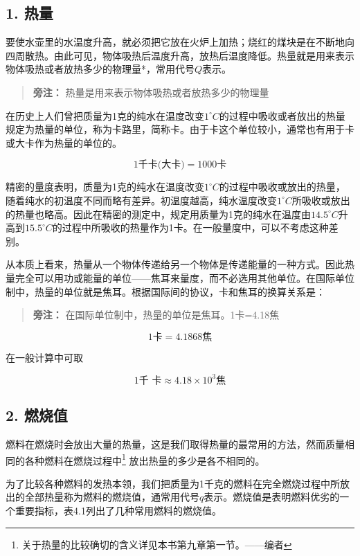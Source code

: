 \subsection{1. 热量}\label{ux70edux91cf}

要使水壶里的水温度升高，就必须把它放在火炉上加热；烧红的煤块是在不断地向四周散热。由此可见，物体吸热后温度升高，放热后温度降低。热量就是用来表示物体吸热或者放热多少的物理量*，常用代号\(Q\)表示。

\begin{quote}
\textbf{旁注：} 热量是用来表示物体吸热或者放热多少的物理量
\end{quote}

在历史上人们曾把质量为1克的纯水在温度改变\(1^{\circ}C\)的过程中吸收或者放出的热量规定为热量的单位，称为卡路里，简称卡。由于卡这个单位较小，通常也有用于卡或大卡作为热量的单位的。

\[
1 \text{千卡(大卡)} = 1000 \text{卡}
\]

精密的量度表明，质量为1克的纯水在温度改变\(1^{\circ}C\)的过程中吸收或放出的热量，随着纯水的初温度不同而略有差异。初温度越高，纯水温度改变\(1^{\circ}C\)所吸收或放出的热量也略高。因此在精密的测定中，规定用质量为1克的纯水在温度由\(14.5^{\circ}C\)升高到\(15.5^{\circ}C\)的过程中所吸收的热量作为1卡。在一般量度中，可以不考虑这种差别。

从本质上看来，热量从一个物体传递给另一个物体是传递能量的一种方式。因此热量完全可以用功或能量的单位------焦耳来量度，而不必选用其他单位。在国际单位制中，热量的单位就是焦耳。根据国际间的协议，卡和焦耳的换算关系是：

\begin{quote}
\textbf{旁注：} 在国际单位制中，热量的单位是焦耳。1卡=4.18焦
\end{quote}

\[
1 \text{卡} = 4.1868 \text{焦}
\]

在一般计算中可取

\[
1 \text{千   卡} \approx 4.18 \times 10 ^ {3} \text{焦}
\]

\subsection{2. 燃烧值}\label{ux71c3ux70e7ux503c}

燃料在燃烧时会放出大量的热量，这是我们取得热量的最常用的方法，然而质量相同的各种燃料在燃烧过程中\footnote{关于热量的比较确切的含义详见本书第九章第一节。------编者}
放出热量的多少是各不相同的。

为了比较各种燃料的发热本领，我们把质量为1千克的燃料在完全燃烧过程中所放出的全部热量称为燃料的燃烧值，通常用代号\(q\)表示。燃烧值是表明燃料优劣的一个重要指标，表4.1列出了几种常用燃料的燃烧值。

